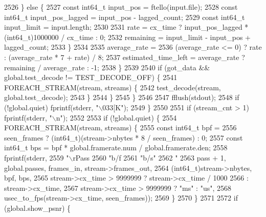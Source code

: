 \begin{DoxyCodeInclude}
{{{{{{{{{{{{{{{{{{{{{{{{{{{{{{{{{{{{{{{{{{{{{{{{{{{{{{{{{{{2526           \} \textcolor{keywordflow}{else} \{
2527             \textcolor{keyword}{const} int64\_t input\_pos = ftello(input.file);
2528             \textcolor{keyword}{const} int64\_t input\_pos\_lagged = input\_pos - lagged\_count;
2529             \textcolor{keyword}{const} int64\_t input\_limit = input.length;
2530 
2531             rate = cx\_time ? input\_pos\_lagged * (int64\_t)1000000 / cx\_time : 0;
2532             remaining = input\_limit - input\_pos + lagged\_count;
2533           \}
2534 
2535           average\_rate =
2536               (average\_rate <= 0) ? rate : (average\_rate * 7 + rate) / 8;
2537           estimated\_time\_left = average\_rate ? remaining / average\_rate : -1;
2538         \}
2539 
2540         \textcolor{keywordflow}{if} (got\_data && global.test\_decode != TEST\_DECODE\_OFF) \{
2541           FOREACH\_STREAM(stream, streams) \{
2542             test\_decode(stream, global.test\_decode);
2543           \}
2544         \}
2545       \}
2546 
2547       fflush(stdout);
2548       \textcolor{keywordflow}{if} (!global.quiet) fprintf(stderr, \textcolor{stringliteral}{"\(\backslash\)033[K"});
2549     \}
2550 
2551     \textcolor{keywordflow}{if} (stream\_cnt > 1) fprintf(stderr, \textcolor{stringliteral}{"\(\backslash\)n"});
2552 
2553     \textcolor{keywordflow}{if} (!global.quiet) \{
2554       FOREACH\_STREAM(stream, streams) \{
2555         \textcolor{keyword}{const} int64\_t bpf =
2556             seen\_frames ? (int64\_t)(stream->nbytes * 8 / seen\_frames) : 0;
2557         \textcolor{keyword}{const} int64\_t bps = bpf * global.framerate.num / global.framerate.den;
2558         fprintf(stderr,
2559                 \textcolor{stringliteral}{"\(\backslash\)rPass %
2560                 \textcolor{stringliteral}{"b/f %
2561                 \textcolor{stringliteral}{"b/s"}
2562                 \textcolor{stringliteral}{" %
2563                 pass + 1, global.passes, frames\_in, stream->frames\_out,
2564                 (int64\_t)stream->nbytes, bpf, bps,
2565                 stream->cx\_time > 9999999 ? stream->cx\_time / 1000
2566                                           : stream->cx\_time,
2567                 stream->cx\_time > 9999999 ? \textcolor{stringliteral}{"ms"} : \textcolor{stringliteral}{"us"},
2568                 usec\_to\_fps(stream->cx\_time, seen\_frames));
2569       \}
2570     \}
2571 
2572     \textcolor{keywordflow}{if} (global.show\_psnr) \{
}}}}}}}}}}}}}}}}}}}}}}}}}}}}}}}}}}}}}}}}}}}}}}}}}}}}}}}}}}}}}}
\end{DoxyCodeInclude}
